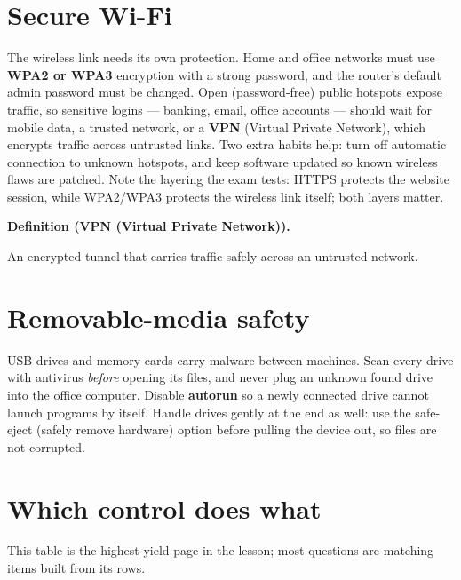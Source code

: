 \documentclass[11pt]{article}
\newenvironment{definitionbox}[1]{%
  \par\noindent\textbf{Definition (#1).}\ \itshape
}{\par\vspace{0.3em}}
\begin{document}
\section{Secure Wi-Fi}
The wireless link needs its own protection. Home and office networks must use
\textbf{WPA2 or WPA3} encryption with a strong password, and the router's
default admin password must be changed. Open (password-free) public hotspots
expose traffic, so sensitive logins --- banking, email, office accounts ---
should wait for mobile data, a trusted network, or a \textbf{VPN} (Virtual
Private Network), which encrypts traffic across untrusted links. Two extra
habits help: turn off automatic connection to unknown hotspots, and keep
software updated so known wireless flaws are patched. Note the layering the
exam tests: HTTPS protects the website session, while WPA2/WPA3 protects the
wireless link itself; both layers matter.

\begin{definitionbox}{VPN (Virtual Private Network)}
An encrypted tunnel that carries traffic safely across an untrusted network.
\end{definitionbox}

\section{Removable-media safety}
USB drives and memory cards carry malware between machines. Scan every drive
with antivirus \emph{before} opening its files, and never plug an unknown
found drive into the office computer. Disable \textbf{autorun} so a
newly connected drive cannot launch programs by itself. Handle drives gently
at the end as well: use the safe-eject (safely remove hardware) option before
pulling the device out, so files are not corrupted.

\section{Which control does what}
This table is the highest-yield page in the lesson; most questions are
matching items built from its rows.
\end{document}
